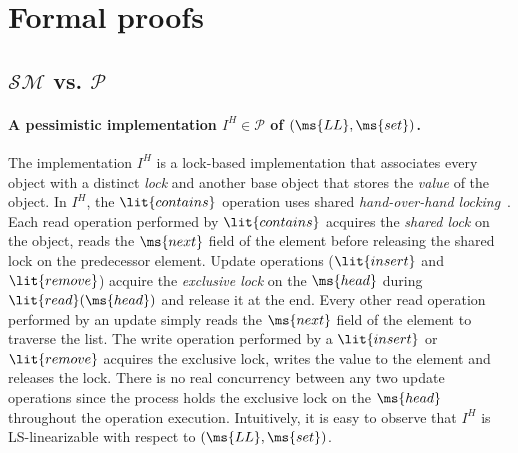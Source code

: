 \documentclass[11pt,pdftex,letterpaper]{article}
\newcommand{\LL}{\ms{LL}}
\begin{document}
\section{Formal proofs}
\label{app:proofs}
\subsection{$\mathcal{SM}$ vs. $\mathcal{P}$}
\label{app:smp}
\paragraph{A pessimistic implementation $I^H\in \mathcal{P}$ of $(\LL,\ms{set})$.}
The implementation $I^H$ is a lock-based implementation that associates every object with a 
distinct \emph{lock} and another base object that stores the \emph{value} of the object.
In $I^H$, the $\lit{contains}$ operation uses shared \emph{hand-over-hand 
locking}~\cite{BS88,HS08-book}.
Each read operation performed by $\lit{contains}$ 
acquires the \emph{shared lock} on the object, 
reads the $\ms{next}$ field of the element before releasing the shared lock on the predecessor element. 
Update operations ($\lit{insert}$ and
$\lit{remove}$) acquire the \emph{exclusive lock} on the $\ms{head}$ during $\lit{read}(\ms{head})$ 
and release it at the end. Every other read operation performed 
by an update simply reads the $\ms{next}$ field of the element to traverse the list. The write operation
performed by a $\lit{insert}$ or $\lit{remove}$ acquires the exclusive lock, writes the value
to the element and releases the lock.
There is no real concurrency between any two update operations since the process holds the 
exclusive lock on the $\ms{head}$ throughout the operation execution.
Intuitively, it is easy to observe that $I^H$ is LS-linearizable with respect to $(\LL,\ms{set})$.
\end{document}
